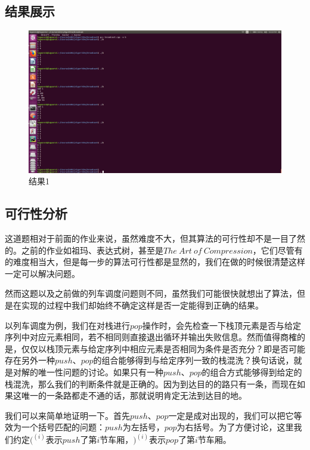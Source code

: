 \documentclass[UTF8]{ctexart}
\begin{document}
	\subsection{结果展示}

\begin{figure}[H]
	\centering 
	\includegraphics[scale=0.5]{res.png} 
	\caption{结果1} 
	\label{res1}
\end{figure}

	\subsection{可行性分析}
	\indent 这道题相对于前面的作业来说，虽然难度不大，但其算法的可行性却不是一目了然的。之前的作业如祖玛、表达式树，甚至是$The\ Art\ of\ Compression$，它们尽管有的难度相当大，但是每一步的算法可行性都是显然的，我们在做的时候很清楚这样一定可以解决问题。
	
	\indent 然而这题以及之前做的列车调度问题则不同，虽然我们可能很快就想出了算法，但是在实现的过程中我们却始终不确定这样是否一定能得到正确的结果。
	
	\indent 以列车调度为例，我们在对栈进行$pop$操作时，会先检查一下栈顶元素是否与给定序列中对应元素相同，若不相同则直接退出循环并输出失败信息。然而值得商榷的是，\textcolor[rgb]{1,0,0}{仅仅以栈顶元素与给定序列中相应元素是否相同为条件是否充分}？\textcolor[rgb]{1,0,0}{即是否可能存在另外一种$push$、$pop$的组合能够得到与给定序列一致的栈混洗}？换句话说，就是对\textcolor[rgb]{1,0,0}{解的唯一性问题}的讨论。如果只有一种$push$、$pop$的组合方式能够得到给定的栈混洗，那么我们的判断条件就是正确的。因为到达目的的路只有一条，而现在如果这唯一的一条路都走不通的话，那就说明肯定无法到达目的地。
	
	\indent 我们可以来简单地证明一下。首先$push$、$pop$一定是成对出现的，我们可以把它等效为一个括号匹配的问题：$push$为左括号，$pop$为右括号。为了方便讨论，这里我们约定$(^{(i)}$表示$push$了第$i$节车厢，$)^{(i)}$表示$pop$了第$i$节车厢。
	
\end{document}
